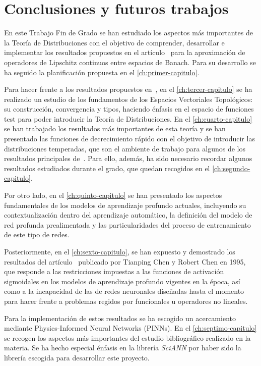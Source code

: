 \chapter{Conclusiones y futuros trabajos}\label{ch:noveno-capitulo}


En este Trabajo Fin de Grado se han estudiado los aspectos más importantes de la Teoría de Distribuciones con el objetivo de comprender, desarrollar e implementar los resultados propuestos en el artículo~\cite{chen1995universal} para la aproximación de operadores de Lipschitz continuos entre espacios de Banach. Para su desarrollo se ha seguido la planificación propuesta en el \autoref{ch:primer-capitulo}.

Para hacer frente a los resultados propuestos en~\cite{chen1995universal}, en el \autoref{ch:tercer-capitulo} se ha realizado un estudio de los fundamentos de los Espacios Vectoriales Topológicos: su construcción, convergencia y tipos, haciendo énfasis en el espacio de funciones test para poder introducir la Teoría de Distribuciones. En el \autoref{ch:cuarto-capitulo} se han trabajado los resultados más importantes de esta teoría y se han presentado las funciones de decrecimiento rápido con el objetivo de introducir las distribuciones temperadas, que son el ambiente de trabajo para algunos de los resultados principales de~\cite{chen1995universal}. Para ello, además, ha sido necesario recordar algunos resultados estudiados durante el grado, que quedan recogidos en el \autoref{ch:segundo-capitulo}.

Por otro lado, en el \autoref{ch:quinto-capitulo} se han presentado los aspectos fundamentales de los modelos de aprendizaje profundo actuales,
incluyendo su contextualización dentro del aprendizaje automático, la definición del modelo de red profunda prealimentada y las particularidades del proceso de entrenamiento de este tipo de redes. 

Posteriormente, en el \autoref{ch:sexto-capitulo}, se han expuesto y demostrado los resultados del artículo~\cite{chen1995universal} publicado por Tianping Chen y Robert Chen en 1995, que responde a las restricciones impuestas a las funciones de activación sigmoidales en los modelos de aprendizaje profundo vigentes en la época, así como a la incapacidad  de las de redes neuronales diseñadas hasta el momento para hacer frente a problemas regidos por funcionales u operadores no lineales.

Para la implementación de estos resultados se ha escogido un acercamiento mediante Physics-Informed Neural Networks (PINNs). En el \autoref{ch:septimo-capitulo} se recogen los aspectos más importantes del estudio bibliográfico realizado en la materia. Se ha hecho especial énfasis en la librería \textit{SciANN} por haber sido la librería escogida para desarrollar este proyecto. 


